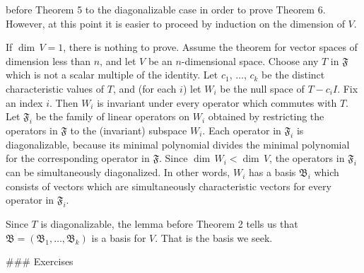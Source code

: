 before Theorem 5 to the diagonalizable case in order to prove Theorem 6. However, at this point it is easier to proceed by induction on the dimension of \(V\).

If \(\dim\,V=1\), there is nothing to prove. Assume the theorem for vector spaces of dimension less than \(n\), and let \(V\) be an \(n\)-dimensional space. Choose any \(T\) in \(\mathfrak{F}\) which is not a scalar multiple of the identity. Let \(c_{1}\), \(\ldots\), \(c_{k}\) be the distinct characteristic values of \(T\), and (for each \(i\)) let \(W_{i}\) be the null space of \(T-c_{i}I\). Fix an index \(i\). Then \(W_{i}\) is invariant under every operator which commutes with \(T\). Let \(\mathfrak{F}_{i}\) be the family of linear operators on \(W_{i}\) obtained by restricting the operators in \(\mathfrak{F}\) to the (invariant) subspace \(W_{i}\). Each operator in \(\mathfrak{F}_{i}\) is diagonalizable, because its minimal polynomial divides the minimal polynomial for the corresponding operator in \(\mathfrak{F}\). Since \(\dim\,W_{i}<\dim\,V\), the operators in \(\mathfrak{F}_{i}\) can be simultaneously diagonalized. In other words, \(W_{i}\) has a basis \(\mathfrak{B}_{i}\) which consists of vectors which are simultaneously characteristic vectors for every operator in \(\mathfrak{F}_{i}\).

Since \(T\) is diagonalizable, the lemma before Theorem 2 tells us that \(\mathfrak{B}=(\mathfrak{B}_{1},\ldots,\mathfrak{B}_{k})\) is a basis for \(V\). That is the basis we seek.

### Exercises

